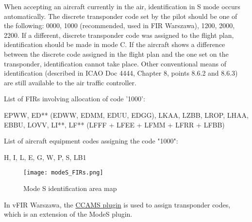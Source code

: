 When accepting an aircraft currently in the air, identification in S mode occurs automatically. The discrete transponder code set by the pilot should be one of the following: 0000, 1000 (recommended, used in FIR Warszawa), 1200, 2000, 2200. If a different, discrete transponder code was assigned to the flight plan, identification should be made in mode C. If the aircraft shows a difference between the discrete code assigned in the flight plan and the one set on the transponder, identification cannot take place. Other conventional means of identification (described in ICAO Doc 4444, Chapter 8, points 8.6.2 and 8.6.3) are still available to the air traffic controller.

List of FIRs involving allocation of code '1000':

\-\hspace{1cm}EPWW, ED** (EDWW, EDMM, EDUU, EDGG), LKAA, LZBB, LROP, LHAA, EBBU, LOVV, LI**, LF** (LFFF + LFEE + LFMM + LFRR + LFBB)

List of aircraft equipment codes assigning the code "1000":

\-\hspace{1cm}H, I, L, E, G, W, P, S, LB1

\begin{figure}[htbp]
    \centering
    \texttt{[image: modeS\_FIRs.png]}
    \caption{Mode S identification area map}
    \label{fig:modeS}
\end{figure}

In vFIR Warszawa, the \href{https://github.com/kusterjs/CCAMS}{CCAMS plugin} is used to assign transponder codes, which is an extension of the ModeS plugin.